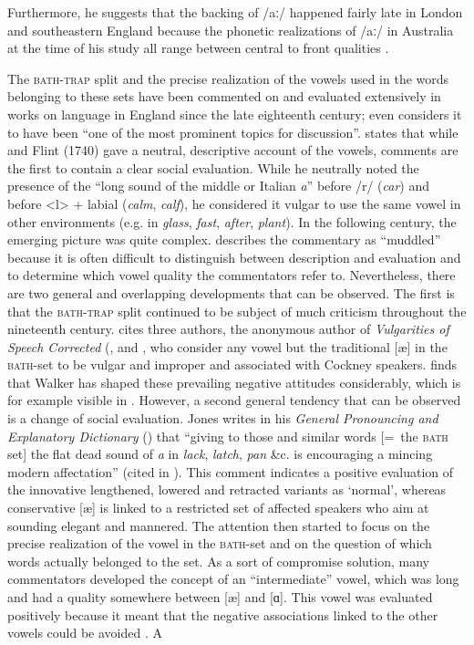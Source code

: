 Furthermore, he suggests that the backing of /aː/ happened fairly late in London and southeastern England because the phonetic realizations of /aː/ in Australia at the time of his study all range between central to front qualities \citep[227]{Bradley1991}.


The \textsc{bath-trap} split and the precise realization of the vowels used in the words belonging to these sets have been commented on and evaluated extensively in works on language in England since the late eighteenth century; \citet[78]{Mugglestone2003} even considers it to have been “one of the most prominent topics for discussion”. \citet[90]{Lass2006} states that while \citet{Cooper1687} and Flint (1740) gave a neutral, descriptive account of the vowels,  comments are the first to contain a clear social evaluation. While he neutrally noted the presence of the “long sound of the middle or Italian \textit{a}” before /r/ (\emph{car}) and before <l> + labial (\emph{calm}, \emph{calf}), he considered it vulgar to use the same vowel in other environments (e.g. in \emph{glass}, \emph{fast}, \emph{after}, \emph{plant}). In the following century, the emerging picture was quite complex. \citet[117]{Bailey1996} describes the commentary as “muddled” because it is often difficult to distinguish between description and evaluation and to determine which vowel quality the commentators refer to. Nevertheless, there are two general and overlapping developments that can be observed. The first is that the \textsc{bath-trap} split continued to be subject of much criticism throughout the nineteenth century. \citet[118-119]{Bailey1996} cites three authors, the anonymous author of \textit{Vulgarities of Speech Corrected} (\citeyear[256--267]{Anonymous1826}, \citet[xxvi--xxvii]{Savage1833} and \citet[25]{Leigh1840}, who consider any vowel but the traditional [æ] in the \textsc{bath}{}-set to be vulgar and improper and associated with Cockney speakers. \citet[81]{Mugglestone2003} finds that Walker has shaped these prevailing negative attitudes considerably, which is for example visible in \citet{Longmuir1864}. However, a second general tendency that can be observed is a change of social evaluation. Jones writes in his \emph{General Pronouncing and Explanatory Dictionary} (\citeyear[ii-iii]{Jones1798}) that “giving to those and similar words [=~the \textsc{bath} set] the flat dead sound of \emph{a} in \emph{lack}, \emph{latch}, \emph{pan} \&c. is encouraging a mincing modern affectation” (cited in \citealt[194]{Jones2006}). This comment indicates a positive evaluation of the innovative lengthened, lowered and retracted variants as ‘normal’, whereas conservative [æ] is linked to a restricted set of affected speakers who aim at sounding elegant and mannered. The attention then started to focus on the precise realization of the vowel in the \textsc{bath}{}-set and on the question of which words actually belonged to the set. As a sort of compromise solution, many commentators developed the concept of an “intermediate” vowel, which was long and had a quality somewhere between [æ] and [ɑ]. This vowel was evaluated positively because it meant that the negative associations linked to the other vowels could be avoided \citep[122--123]{Bailey1996}. A 